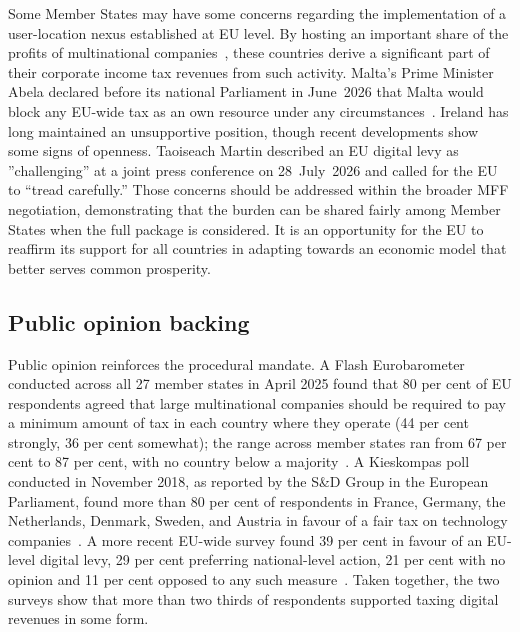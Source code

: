 \documentclass[../../main]{subfiles}
\begin{document}
Some Member States may have some concerns regarding the implementation of a user-location nexus established at EU level. 
By hosting an important share of the profits of multinational companies~\citep{tax_foundation_dst_tracker_2026},  these countries derive a significant part of their corporate income tax revenues from such activity.
Malta's Prime Minister Abela declared before its national Parliament in June~2026 that Malta would block any EU-wide tax as an own resource under any circumstances~\citep{abela_veto_jun2026}.
Ireland has long maintained an unsupportive position, though recent developments show some signs of openness. Taoiseach Martin described an EU digital levy as ''challenging'' at a joint press conference on 28~July~2026 and called for the EU to ``tread carefully.''
Those concerns should be addressed within the broader MFF negotiation, demonstrating that the burden can be shared fairly among Member States when the full package is considered. 
It is an opportunity for the EU to reaffirm its support for all countries in adapting towards an economic model that better serves common prosperity.


\subsection{Public opinion backing}
\label{sec:feasibility:democratic}


Public opinion reinforces the procedural mandate.
A Flash Eurobarometer conducted across all 27 member states in April 2025 found that 80 per cent of EU respondents agreed that large multinational companies should be required to pay a minimum amount of tax in each country where they operate (44 per cent strongly, 36 per cent somewhat); the range across member states ran from 67 per cent to 87 per cent, with no country below a majority~\citep{flash_eb_taxation_2025}.
A Kieskompas poll conducted in November 2018, as reported by the S\&D Group in the European Parliament, found more than 80 per cent of respondents in France, Germany, the Netherlands, Denmark, Sweden, and Austria in favour of a fair tax on technology companies~\citep{kieskompas_sd_2018}.
A more recent EU-wide survey found 39 per cent in favour of an EU-level digital levy, 29 per cent preferring national-level action, 21 per cent with no opinion and 11 per cent opposed to any such measure~\citep{polling_europe_euroscope_13_2026}.
Taken together, the two surveys show that more than two thirds of respondents supported taxing digital revenues in some form.
\end{document}

